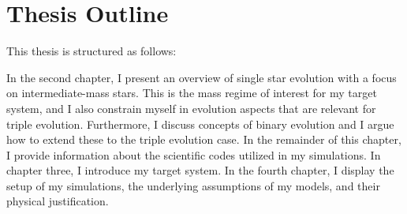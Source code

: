 \section{Thesis Outline}

This thesis is structured as follows: 

In the second chapter, I present an overview of single star evolution with a focus on intermediate-mass stars. This is the mass regime of interest for my target system, and I also constrain myself in evolution aspects that are relevant for triple evolution. Furthermore, I discuss concepts of binary evolution and I argue how to extend these to the triple evolution case. In the remainder of this chapter, I provide information about the scientific codes utilized in my simulations. In chapter three, I introduce my target system. In the fourth chapter, I display the setup of my simulations, the underlying assumptions of my models, and their physical justification.



